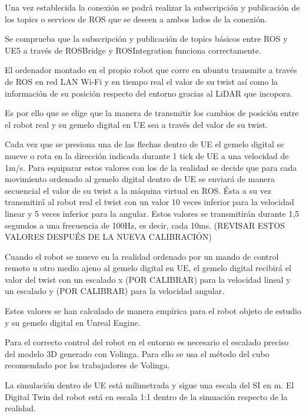 \documentclass[a4paper, 12pt, spanish, twoside]{article}
\begin{document}
Una vez establecida la conexión se podrá realizar la subscripción y publicación de los topics o services de ROS que se deseen a ambos lados de la conexión. 

Se comprueba que la subscripción y publicación de topics básicos entre ROS y UE5 a través de ROSBridge y ROSIntegration funciona correctamente. 


El ordenador montado en el propio robot que corre en ubuntu transmite a través de ROS en red LAN Wi-Fi y en tiempo real el valor de su twist así como la información de su posición respecto del entorno gracias al LiDAR que incopora. 

Es por ello que se elige que la manera de transmitir los cambios de posición entre el robot real y su gemelo digital en UE sea a través del valor de su twist. 

Cada vez que se presiona una de las flechas dentro de UE el gemelo digital se mueve o rota en la dirección indicada durante 1 tick de UE a una velocidad de 1m/s. Para equiparar estos valores con los de la realidad se decide que para cada movimiento ordenado al gemelo digital dentro de UE se enviará de manera secuencial el valor de su twist a la máquina virtual en ROS. Ésta a su vez transmitirá al robot real el twist con un valor 10 veces inferior para la velocidad linear y 5 veces inferior para la angular. Estos valores se transmitirán durante 1,5 segundos a una frecuencia de 100Hz, es decir, cada 10ms. (REVISAR ESTOS VALORES DESPUÉS DE LA NUEVA CALIBRACIÓN) 

Cuando el robot se mueve en la realidad ordenado por un mando de control remoto u otro medio ajeno al gemelo digital en UE, el gemelo digital recibirá el valor del twist con un escalado x (POR CALIBRAR) para la velocidad lineal y un escalado y (POR CALIBRAR) para la velocidad angular. 

Estos valores se han calculado de manera empírica para el robot objeto de estudio y su gemelo digital en Unreal Engine. 


Para el correcto control del robot en el entorno es necesario el escalado preciso del modelo 3D generado con Volinga. Para ello se usa el método del cubo recomendado por los trabajadores de Volinga. 

La simulación dentro de UE está milimetrada y sigue una escala del SI en m. El Digital Twin del robot está en escala 1:1 dentro de la simuación respecto de la realidad.  
\end{document}
